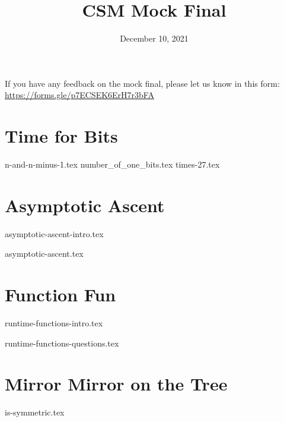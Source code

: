 \documentclass[11pt]{exam}
\title{CSM Mock Final}
\date{December 10, 2021}
\begin{document}
\maketitle
If you have any feedback on the mock final, please let us know in this form: \href{https://forms.gle/p7ECSEK6ErH7r3bFA}{https://forms.gle/p7ECSEK6ErH7r3bFA}

\section{Time for Bits}
\begin{questions}
{n-and-n-minus-1.tex}
{number_of_one_bits.tex}
{times-27.tex}
\end{questions}

\newpage
\section{Asymptotic Ascent}
{asymptotic-ascent-intro.tex}
\begin{questions}
{asymptotic-ascent.tex}

\end{questions}

\newpage
\section{Function Fun}
{runtime-functions-intro.tex}
\begin{questions}
{runtime-functions-questions.tex}
\end{questions}

\newpage
\section{Mirror Mirror on the Tree}
\begin{questions}
{is-symmetric.tex}
\end{questions}
\end{document}
